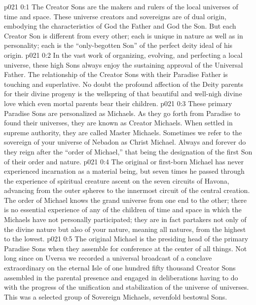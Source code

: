 \author{Perfector of Wisdom}
\vs p021 0:1 The Creator Sons are the makers and rulers of the local universes of time and space. These universe creators and sovereigns are of dual origin, embodying the characteristics of God the Father and God the Son. But each Creator Son is different from every other; each is unique in nature as well as in personality; each is the “only\hyp{}begotten Son” of the perfect deity ideal of his origin.\plusone
\vs p021 0:2 In the vast work of organizing, evolving, and perfecting a local universe, these high Sons always enjoy the sustaining approval of the Universal Father. The relationship of the Creator Sons with their Paradise Father is touching and superlative. No doubt the profound affection of the Deity parents for their divine progeny is the wellspring of that beautiful and well\hyp{}nigh divine love which even mortal parents bear their children.\plusone
\vs p021 0:3 These primary Paradise Sons are personalized as Michaels. As they go forth from Paradise to found their universes, they are known as Creator Michaels. When settled in supreme authority, they are called Master Michaels. Sometimes we refer to the sovereign of your universe of Nebadon as Christ Michael. Always and forever do they reign after the “order of Michael,” that being the designation of the first Son of their order and nature.
\pc \vs p021 0:4 The original or first\hyp{}born Michael has never experienced incarnation as a material being, but seven times he passed through the experience of spiritual creature ascent on the seven circuits of Havona, advancing from the outer spheres to the innermost circuit of the central creation. The order of Michael knows the grand universe from one end to the other; there is no essential experience of any of the children of time and space in which the Michaels have not personally participated; they are in fact partakers not only of the divine nature but also of your nature, meaning all natures, from the highest to the lowest.
\vs p021 0:5 The original Michael is the presiding head of the primary Paradise Sons when they assemble for conference at the center of all things. Not long since on Uversa we recorded a universal broadcast of a conclave extraordinary on the eternal Isle of one hundred fifty thousand Creator Sons assembled in the parental presence and engaged in deliberations having to do with the progress of the unification and stabilization of the universe of universes. This was a selected group of Sovereign Michaels, sevenfold bestowal Sons.\plusone
{}
